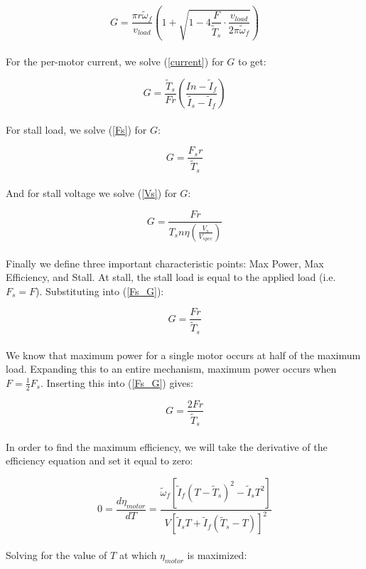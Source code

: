 \documentclass[a4paper]{article}
\begin{document}
	\begin{equation}
		G = \frac{\pi r \widetilde{\omega}_f}{v_{load}} \left( 1 + \sqrt{1 - 4 \frac{F}{\widetilde{T}_s} \cdot \frac{v_{load}}{2\pi \widetilde{\omega}_f}} \right)
	\end{equation}
	\\
	For the per-motor current, we solve (\ref{current}) for $ G $ to get:
	
	\begin{equation}
		G = \frac{\widetilde{T}_s}{F r} \left( \frac{I n - \widetilde{I}_f}{\widetilde{I_s} - \widetilde{I}_f} \right)
	\end{equation}
	\\
	For stall load, we solve (\ref{Fs}) for $ G $:
	
	\begin{equation} \label{Fs_G}
		G = \frac{F_s r}{\widetilde{T}_s}
	\end{equation}
	\\
	And for stall voltage we solve (\ref{Vs}) for $ G $:
	
	\begin{equation}
		G = \frac{F r}{T_s n \eta \left( \frac{V_s}{V_{spec}} \right) }
	\end{equation}
	\\
	Finally we define three important characteristic points: Max Power, Max Efficiency, and Stall. At stall, the stall load is equal to the applied load (i.e. $ F_s = F $). Substituting into (\ref{Fs_G}):
	
	\begin{equation}
		G = \frac{F r}{\widetilde{T}_s}
	\end{equation}
	\\
	We know that maximum power for a single motor occurs at half of the maximum load. Expanding this to an entire mechanism, maximum power occurs when $ F = \frac{1}{2} F_s $. Inserting this into (\ref{Fs_G}) gives:
	
	\begin{equation}
		G = \frac{2 F r}{\widetilde{T}_s}
	\end{equation}
	\\
	In order to find the maximum efficiency, we will take the derivative of the efficiency equation and set it equal to zero:
	
	\begin{equation}
		0 = \frac{d \eta_{motor}}{dT} = \frac{\widetilde{\omega}_f \left[ \widetilde{I}_f (T - \widetilde{T}_s)^2 - \widetilde{I}_s T^2 \right]}{V \left[ \widetilde{I}_s T + \widetilde{I}_f (\widetilde{T}_s - T) \right]^2}
	\end{equation}
	\\
	Solving for the value of $ T $ at which $ \eta_{motor} $ is maximized:
	
\end{document}

